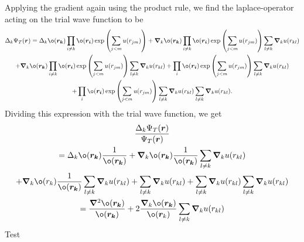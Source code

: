 Applying the gradient again using the product rule, we find the laplace-operator acting on the trial wave function to be 
\begin{gather*}
\Delta _{k} \Psi _{T}(\boldsymbol{r}) = \Delta _{k}ø(\boldsymbol{r_k})\prod_{i\neq k}^{}ø(\boldsymbol{r_i})
\exp\left(\sum_{j<m}^{} u(r _{jm})\right) + \grad _{k}ø(\boldsymbol{r_k})\prod_{i\neq k}^{}ø(\boldsymbol{r_i})\exp\left(\sum_{j<m}^{} u(r _{jm})\right) \sum_{l \neq  k} \boldsymbol{\nabla} _ku(r _{kl})\\
+\boldsymbol{ \nabla }_kø(\boldsymbol{r_k}) \prod_{i \neq k}^{} ø(\boldsymbol{r_i}) 
\exp\left(\sum_{j<m}^{} u(r _{jm})\right) \sum_{l \neq  k} \boldsymbol{\nabla} _ku(r _{kl}) + \prod_{i}^{} 
ø(\boldsymbol{r_i}) \exp\left(\sum_{j<m}^{} u(r _{jm})\right) \sum_{l \neq k}^{} \boldsymbol{\nabla }_ku(r _{kl})\\ 
+\prod_{i}^{} ø(\boldsymbol{r_i})\exp\left(\sum_{j<m}^{} u(r _{jm}	)\right) 
\sum_{l \neq k}^{} \boldsymbol{\nabla }_ku(r _{kl}) 
\sum_{l \neq k} \boldsymbol{\nabla }_ku(r _{kl}).
\end{gather*}
Dividing this expression with the trial wave function, we get 
\begin{gather*}
\frac{\Delta _{k} \Psi _{T}(\boldsymbol{r})}{\Psi _{T}(\boldsymbol{r})}\\
=\Delta _{k}ø(\boldsymbol{r_k})\frac{1}{ø(\boldsymbol{r_k})} + \grad _{k}ø(\boldsymbol{r_k}) \frac{1}{ø(\boldsymbol{r_k})} \sum_{l \neq  k} \boldsymbol{\nabla} _ku(r _{kl})\\
+\boldsymbol{ \nabla }_kø(r_k)  \frac{1}{ø(\boldsymbol{r_k})} \sum_{l \neq  k} \boldsymbol{\nabla} _ku(r _{kl}) +  \sum_{l \neq k}^{} \boldsymbol{\nabla }_ku(r _{kl})
+\sum_{l \neq k}^{} \boldsymbol{\nabla }_ku(r _{kl}) \sum_{l \neq k} \boldsymbol{\nabla }_ku(r _{kl})\\
= \frac{\boldsymbol{\nabla} ^2ø(\boldsymbol{r_k})}{ø(\boldsymbol{r_k})}+ 2 \frac{\boldsymbol{\nabla }_k ø(\boldsymbol{r_k})}{ø(\boldsymbol{r}_k)} \sum_{l \neq k}^{} \boldsymbol{\nabla  }_ku(r _{kl})	
\end{gather*}
Test
